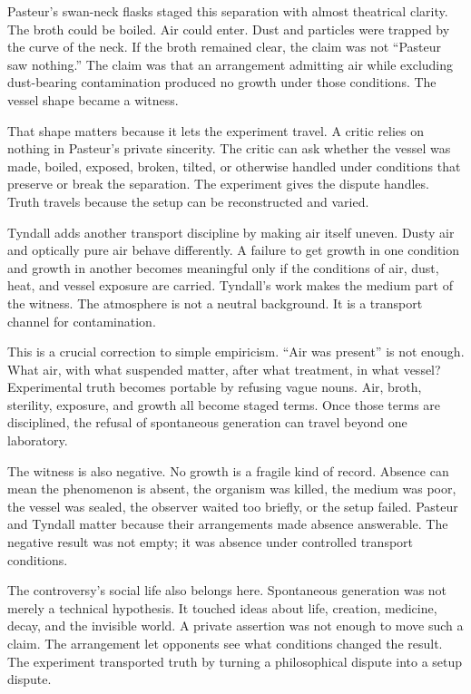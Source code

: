 Pasteur's swan-neck flasks staged this separation with almost theatrical
clarity. The broth could be boiled. Air could enter. Dust and particles were
trapped by the curve of the neck. If the broth remained clear, the claim
was not ``Pasteur saw nothing.'' The claim was that an arrangement admitting
air while excluding dust-bearing contamination produced no growth under those
conditions. The vessel shape became a witness.

That shape matters because it lets the experiment travel. A critic relies
on nothing in Pasteur's private sincerity. The critic can ask whether the
vessel was made, boiled, exposed, broken, tilted, or otherwise handled
under conditions that preserve or break the separation. The experiment
gives the dispute handles. Truth travels because the setup can be
reconstructed and varied.

Tyndall adds another transport discipline by making air itself uneven.
Dusty air and optically pure air behave differently. A failure to get
growth in one condition and growth in another becomes meaningful only if
the conditions of air, dust, heat, and vessel exposure are carried.
Tyndall's work makes the medium part of the witness. The atmosphere is not
a neutral background. It is a transport channel for contamination.

This is a crucial correction to simple empiricism. ``Air was present'' is
not enough. What air, with what suspended matter, after what treatment, in
what vessel? Experimental truth becomes portable by refusing vague nouns.
Air, broth, sterility, exposure, and growth all become staged terms. Once
those terms are disciplined, the refusal of spontaneous generation can
travel beyond one laboratory.

The witness is also negative. No growth is a fragile kind of record.
Absence can mean the phenomenon is absent, the organism was killed, the
medium was poor, the vessel was sealed, the observer waited too briefly, or
the setup failed. Pasteur and Tyndall matter because their arrangements
made absence answerable. The negative result was not empty; it was absence
under controlled transport conditions.

The controversy's social life also belongs here. Spontaneous generation
was not merely a technical hypothesis. It touched ideas about life,
creation, medicine, decay, and the invisible world. A private assertion was
not enough to move such a claim. The arrangement let opponents see what
conditions changed the result. The experiment transported truth by turning
a philosophical dispute into a setup dispute.


